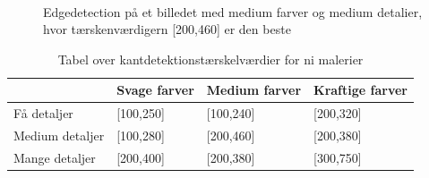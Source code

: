 \begin{figure}[!h]
    \centering
    \\
        \caption[]{Edgedetection på et billedet med medium farver og medium detalier, hvor tærskenværdigern [200,460] er den beste}
     \label{tre}
\end{figure}

\begin{table}[!h]
    \centering
    \begin{tabular}{| l | l | l | l |} \hline
        & Svage farver 	& Medium farver & Kraftige farver \\ \hline
        Få detaljer 		& [100,250]		& [100,240]		& [200,320]\\ \hline
        Medium detaljer 	& [100,280]		& [200,460]		& [200,380]\\ \hline
        Mange detaljer		& [200,400]		& [200,380]		& [300,750]\\ \hline
    \end{tabular}
    \caption{Tabel over kantdetektionstærskelværdier for ni malerier}
    \label{thressholdsTabelKant}
\end{table}

